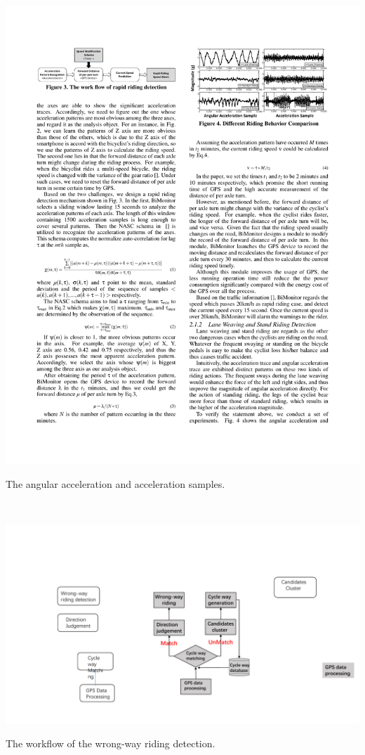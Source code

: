 \documentclass{sigchi-ext}
\begin{document}
\begin{marginfigure}[-42pc]
	\begin{turn}{90}
		\begin{minipage}{2\marginparwidth}
			\centering
			\includegraphics[width=1.7\marginparwidth]{figures/acc.pdf}
			\caption{The angular acceleration and acceleration samples. } ~\label{fig:acc}
		\end{minipage}
	\end{turn}
\end{marginfigure}


\begin{marginfigure}[-10 pc]
	\begin{minipage}{1\marginparwidth}
		\centering
		\includegraphics[width=0.9 \marginparwidth]{figures/gps_workflow.pdf}
		\caption{The workflow of the wrong-way riding detection. } ~\label{fig:gps_workflow}
	\end{minipage}
\end{marginfigure}
\end{document}
